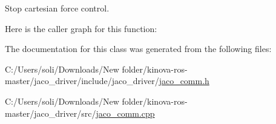 Stop cartesian force control. 



Here is the caller graph for this function\+:




The documentation for this class was generated from the following files\+:\begin{DoxyCompactItemize}
\item 
C\+:/\+Users/soli/\+Downloads/\+New folder/kinova-\/ros-\/master/jaco\+\_\+driver/include/jaco\+\_\+driver/\hyperlink{jaco__comm_8h}{jaco\+\_\+comm.\+h}\item 
C\+:/\+Users/soli/\+Downloads/\+New folder/kinova-\/ros-\/master/jaco\+\_\+driver/src/\hyperlink{jaco__comm_8cpp}{jaco\+\_\+comm.\+cpp}\end{DoxyCompactItemize}
